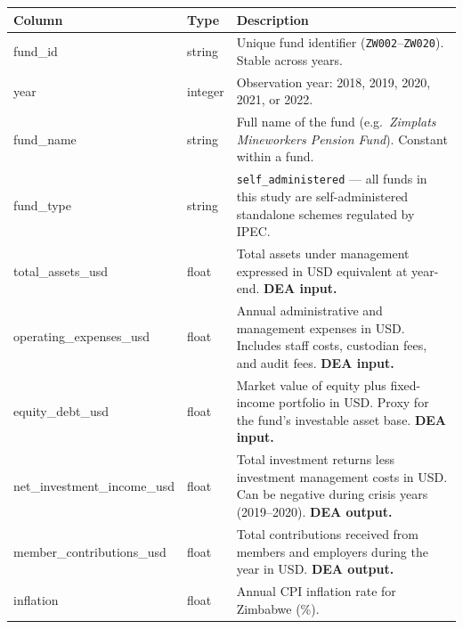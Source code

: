 \documentclass[12pt,a4paper]{article}
\begin{document}
\begin{longtable}{>{\ttfamily}p{4.8cm} p{2.2cm} p{7.4cm}}
\toprule
\textbf{Column} & \textbf{Type} & \textbf{Description} \\
\midrule
\endhead
\bottomrule
\endfoot
fund\_id          & string  & Unique fund identifier (\texttt{ZW002}--\texttt{ZW020}).
                              Stable across years. \\[4pt]
year              & integer & Observation year: 2018, 2019, 2020, 2021, or 2022. \\[4pt]
fund\_name        & string  & Full name of the fund (e.g.\
                              \textit{Zimplats Mineworkers Pension Fund}).
                              Constant within a fund. \\[4pt]
fund\_type        & string  & \texttt{self\_administered} --- all funds in this study
                              are self-administered standalone schemes regulated by
                              IPEC. \\[4pt]
total\_assets\_usd          & float & Total assets under management expressed in
                                      USD equivalent at year-end.
                                      \textbf{DEA input.} \\[4pt]
operating\_expenses\_usd    & float & Annual administrative and management expenses
                                      in USD.  Includes staff costs, custodian fees,
                                      and audit fees.
                                      \textbf{DEA input.} \\[4pt]
equity\_debt\_usd           & float & Market value of equity plus fixed-income
                                      portfolio in USD.  Proxy for the fund's
                                      investable asset base.
                                      \textbf{DEA input.} \\[4pt]
net\_investment\_income\_usd & float & Total investment returns less investment
                                       management costs in USD.  Can be negative
                                       during crisis years (2019--2020).
                                       \textbf{DEA output.} \\[4pt]
member\_contributions\_usd  & float & Total contributions received from members and
                                      employers during the year in USD.
                                      \textbf{DEA output.} \\[4pt]
inflation         & float & Annual CPI inflation rate for Zimbabwe (\%).

\end{longtable}
\end{document}
